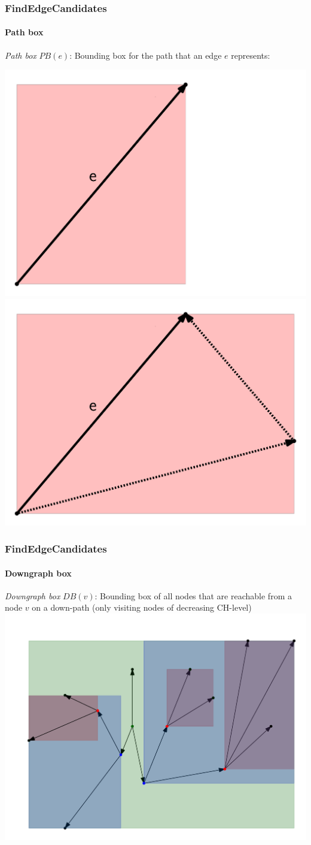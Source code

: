 \documentclass[10pt, t,
aspectratio=169,%
]{beamer}
\newcommand{\findEdgeCandidates}{FindEdgeCandidates\xspace}
\begin{document}
\begin{frame}
	\frametitle{\findEdgeCandidates}
	\framesubtitle{Path box}
	\emph{Path box} $PB(e)$: Bounding box for the path that an edge $e$ represents:

	\includegraphics[width=.45\columnwidth]{images/simplePathBox} \pause
	\includegraphics[width=.45\columnwidth]{images/pathBox}
\end{frame}

\begin{frame}
	\frametitle{\findEdgeCandidates}
	\framesubtitle{Downgraph box}
	\emph{Downgraph box} $DB(v)$: Bounding box of all nodes that are reachable from a node $v$ on a down-path (only visiting nodes of decreasing CH-level)
	\includegraphics[width=.76\columnwidth]{images/downgraphBox}
\end{frame}
\end{document}

